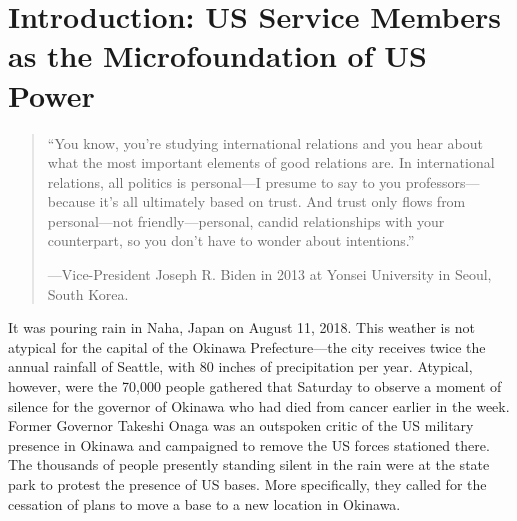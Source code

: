 \chapter{Introduction: US Service Members as the Microfoundation of US Power \label{cha:intro}}

\setcounter{page}{1}


\begin{quote}
	``You know, you're studying international relations and you hear about what the most important elements of good relations are.  In international relations, all politics is personal---I presume to say to you professors---because it's all ultimately based on trust.  And trust only flows from personal---not friendly---personal, candid relationships with your counterpart, so you don't have to wonder about intentions.''
	
	\begin{flushright}
		\begin{minipage}{3in}
			---Vice-President Joseph R. Biden  in 2013 at \hspace*{8pt} Yonsei University in Seoul, South Korea.
		\end{minipage}
		
	\end{flushright}
	
\end{quote}

\doublespacing


\noindent It was pouring rain in Naha, Japan  on August 11, 2018. This weather is not atypical for the capital of the Okinawa Prefecture---the city receives twice the annual rainfall of Seattle, with 80 inches of precipitation per year. Atypical, however, were the 70,000 people gathered that Saturday to observe a moment of silence for the governor of Okinawa who had died from cancer earlier in the week.\autocite{cnbc2018,tjt2018} Former Governor Takeshi Onaga was an outspoken critic of the US military presence in Okinawa and campaigned to remove the US forces stationed there. The thousands of people presently standing silent in the rain were at the state park to protest the presence of US bases. More specifically, they called for the cessation of plans to move a base to a new location in Okinawa. 

